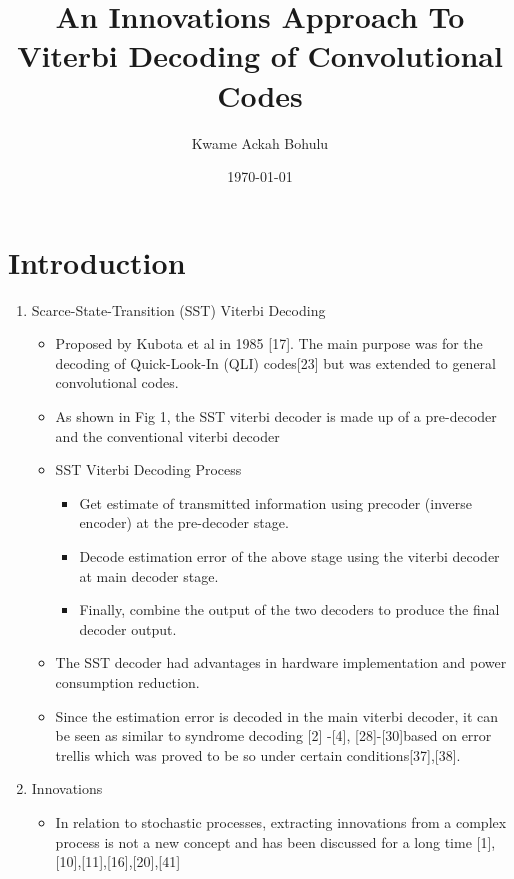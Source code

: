 \documentclass[fontsize=12pt]{article}
\title{An Innovations Approach To Viterbi Decoding of Convolutional Codes}
\author{Kwame Ackah Bohulu}
\date{\today}
\theoremstyle{definition}
\begin{document}
\maketitle

\newpage


\section{Introduction}

\begin{enumerate}

\item {Scarce-State-Transition (SST) Viterbi Decoding}
\begin{itemize}
\item Proposed by Kubota et al in 1985 [17]. The main purpose was for the decoding of Quick-Look-In (QLI) codes[23] but was extended to general convolutional codes.

\item As shown in Fig 1, the SST viterbi decoder is made up of a pre-decoder and the conventional viterbi decoder

\item {SST Viterbi Decoding Process}
\begin{itemize}
\item Get estimate of transmitted information using precoder (inverse encoder) at the pre-decoder stage.

\item Decode estimation error of the above stage using the viterbi decoder at main decoder stage.

\item Finally, combine the output of the two decoders to produce the final decoder output.
\end{itemize}

\item The SST decoder had advantages in hardware implementation and power consumption reduction.

\item Since the estimation error is decoded in the main viterbi decoder, it can be seen as similar to syndrome decoding [2] -[4], [28]-[30]based on error trellis which was proved to be so under certain conditions[37],[38].
\end{itemize}

\item {Innovations}
\begin{itemize}
\item In relation to stochastic processes, extracting innovations from a complex process is not a new concept and has been discussed for a long time [1],[10],[11],[16],[20],[41]


\end{itemize}
\end{enumerate}
\end{document}
